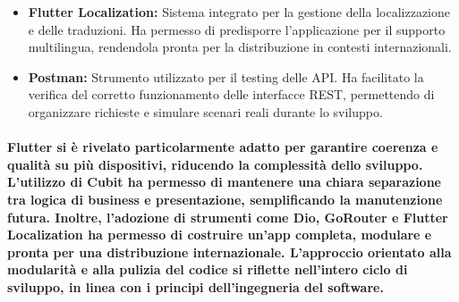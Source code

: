 \begin{itemize}
  \item \textbf{Flutter Localization:} Sistema integrato per la gestione della localizzazione e delle traduzioni. Ha permesso di predisporre l’applicazione per il supporto multilingua, rendendola pronta per la distribuzione in contesti internazionali.
  \item \textbf{Postman:} Strumento utilizzato per il testing delle API. Ha facilitato la verifica del corretto funzionamento delle interfacce REST, permettendo di organizzare richieste e simulare scenari reali durante lo sviluppo.
\end{itemize}


\paragraph{Flutter si è rivelato particolarmente adatto per garantire coerenza e qualità su più dispositivi, riducendo la complessità dello sviluppo. L’utilizzo di Cubit ha permesso di mantenere una chiara separazione tra logica di business e presentazione, semplificando la manutenzione futura. Inoltre, l’adozione di strumenti come Dio, GoRouter e Flutter Localization ha permesso di costruire un’app completa, modulare e pronta per una distribuzione internazionale. L’approccio orientato alla modularità e alla pulizia del codice si riflette nell’intero ciclo di sviluppo, in linea con i principi dell’ingegneria del software.}

